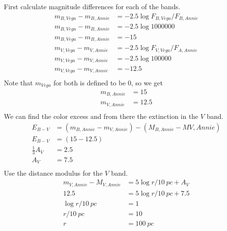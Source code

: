\documentclass[newpage]{homework}
\begin{document}
\question
\begin{alphaparts}
	\questionpart First calculate magnitude differences for each of the bands.
	\begin{align*}
		m_{B,Vega} - m_{B,Annie}	&=	-2.5 \log{F_{B,Vega} / F_{B, Annie}}	\\
		m_{B,Vega} - m_{B,Annie}	&=	-2.5 \log{1000000}	\\
		m_{B,Vega} - m_{B,Annie}	&=	-15	\\
		m_{V,Vega} - m_{V,Annie}	&=	-2.5 \log{F_{V,Vega} / F_{A, Annie}}	\\
		m_{V,Vega} - m_{V,Annie}	&=	-2.5 \log{100000}	\\
		m_{V,Vega} - m_{V,Annie}	&=	-12.5	\\
	\end{align*}
	Note that $m_{Vega}$ for both is defined to be 0, so we get
	\begin{align*}
		m_{B,Annie}	&=	\boxed{15}	\\
		m_{V,Annie}	&=	\boxed{12.5}	\\
	\end{align*}
	\questionpart We can find the color excess and from there the extinction in the $V$ band.
	\begin{align*}
		E_{B-V} &=  (m_{B,Annie} - m_{V,Annie}) - (M_{B,Annie} - M{V,Annie})	\\
		E_{B-V} &=  (15 - 12.5)	\\
		\frac{1}{3} A_V &=  2.5 \\
		A_V &=  \boxed{7.5}    \\
	\end{align*}
	\questionpart Use the distance modulus for the $V$ band.
	\begin{align*}
		m_{V,Annie} - M_{V,Annie}	&=	5 \log {r/\SI{10}{pc}} + A_V	\\
		12.5    &=  5 \log {r/\SI{10}{pc}} + 7.5    \\
		\log {r/\SI{10}{pc}}    &=  1   \\
		r/\SI{10}{pc}	&=	10	\\
		r   &=  \boxed{\SI{100}{pc}}    \\
	\end{align*}
\end{alphaparts}
\end{document}

